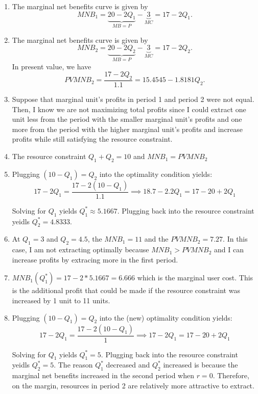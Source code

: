 \documentclass[11pt]{article}
\begin{document}
\begin{enumerate}
{\begin{enumerate}
      \item The marginal net benefits curve is given by 
      $$
        MNB_1 = \underbrace{20 - 2Q_1}_{MB = P} - \underbrace{3}_{MC} = 17 - 2Q_1.
      $$

      \item The marginal net benefits curve is given by 
      $$
        MNB_2 = \underbrace{20 - 2Q_2}_{MB = P} - \underbrace{3}_{MC} = 17 - 2Q_2.
      $$
      In present value, we have
      $$
        PVMNB_2 = \frac{17 - 2Q_2}{1.1} = 15.4545 - 1.8181 Q_2.
      $$
  
      \item Suppose that marginal unit's profits in period 1 and period 2 were not equal. Then, I know we are not maximizing total profits since I could extract one unit less from the period with the smaller marginal unit's profits and one more from the period with the higher marginal unit's profits and increase profits while still satisfying the resource constraint. 
      
      \item The resource constraint $Q_1 + Q_2 = 10$ and $MNB_1 = PVMNB_2$
      
      \item Plugging $(10 - Q_1) = Q_2$ into the optimality condition yields:
      $$
        17 - 2Q_1 = \frac{17 - 2 (10 - Q_1)}{1.1} \implies 18.7 - 2.2 Q_1 = 17 - 20 + 2 Q_1
      $$

      Solving for $Q_1$ yields $Q_1^* \approx 5.1667$. Plugging back into the resource constraint yeidls $Q_2^* = 4.8333$.
      
      \item At $Q_1 = 3$ and $Q_2 = 4.5$, the $MNB_1 = 11$ and the $PVMNB_2 = 7.27$. In this case, I am not extracting optimally because $MNB_1 > PVMNB_2$ and I can increase profits by extracing more in the first period. 
  
      \item $MNB_1(Q_1^*) = 17 - 2 * 5.1667 = 6.666$ which is the marginal user cost. This is the additional profit that could be made if the resource constraint was increased by 1 unit to 11 units.
  
      \item Plugging $(10 - Q_1) = Q_2$ into the (new) optimality condition yields:
      $$
        17 - 2Q_1 = \frac{17 - 2 (10 - Q_1)}{1} \implies 17 - 2 Q_1 = 17 - 20 + 2 Q_1
      $$

      Solving for $Q_1$ yields $Q_1^* = 5$. Plugging back into the resource constraint yeidls $Q_2^* = 5$. The reason $Q_1^*$ decreased and $Q_2^*$ increased is because the marginal net benefits increased in the second period when $r = 0$. Therefore, on the margin, resources in period 2 are relatively more attractive to extract.
    \end{enumerate}
  }


\end{enumerate}
\end{document}
